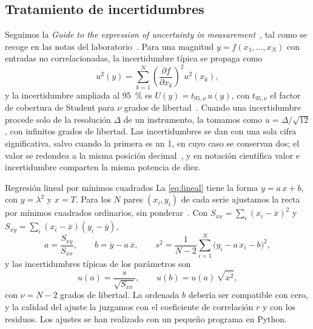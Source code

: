 \documentclass[a4paper,11pt]{amsart}
\numberwithin{equation}{section}
\newcommand{\Tcoef}{t_{95,\nu}}               %
\newcommand{\ext}[1]{U(#1)}                   %
\newcommand{\mean}[1]{\overline{#1}}
\theoremstyle{cienplano}
\theoremstyle{ciendef}
\theoremstyle{cienobs}
\newcounter{metodo}
\newenvironment{metodo}[1][]
  {\par\stepcounter{proposicion}\refstepcounter{metodo}\begin{metodobox}{#1}}
  {\end{metodobox}}
\begin{document}
\subsection{Tratamiento de incertidumbres}\label{sec:incertidumbres}
Seguimos la \emph{Guide to the expression of uncertainty in
measurement}~\cite{GUM}, tal como se recoge en las notas del
laboratorio~\cite{NUM-ARG}. Para una magnitud $y=f(x_1,\dots,x_N)$ con
entradas no correlacionadas, la incertidumbre típica se propaga como
\begin{equation}\label{eq:propagacion}
  u^{2}(y)=\sum_{k=1}^{N}\left(\frac{\partial f}{\partial x_k}\right)^{\!2}u^{2}(x_k),
\end{equation}
y la incertidumbre ampliada al \SI{95}{\percent} es $\ext{y}=\Tcoef\,u(y)$,
con $\Tcoef$ el factor de cobertura de Student para $\nu$ grados de
libertad~\cite{NUM-ARG}. Cuando una incertidumbre procede solo de la
resolución $\Delta$ de un instrumento, la tomamos como
$u=\Delta/\sqrt{12}$, con infinitos grados de libertad. Las incertidumbres se
dan con una sola cifra significativa, salvo cuando la primera es un 1, en
cuyo caso se conservan dos; el valor se redondea a la misma posición
decimal~\cite{ERR-MP}, y en notación científica valor e incertidumbre
comparten la misma potencia de diez.

\begin{metodo}[Regresión lineal por mínimos cuadrados]\label{met:regresion}
La \cref{eq:lineal} tiene la forma $y=a\,x+b$, con $y=\lambda^{2}$ y $x=T$.
Para los $N$ pares $(x_i,y_i)$ de cada serie ajustamos la recta por mínimos
cuadrados ordinarios, sin ponderar~\cite{NUM-ARG,HUGHES}. Con
$S_{xx}=\sum_i(x_i-\mean{x})^{2}$ y $S_{xy}=\sum_i(x_i-\mean{x})(y_i-\mean{y})$,
\begin{equation}\label{eq:regresion}
  a=\frac{S_{xy}}{S_{xx}},
  \qquad
  b=\mean{y}-a\,\mean{x},
  \qquad
  s^{2}=\frac{1}{N-2}\sum_{i=1}^{N}\bigl(y_i-a\,x_i-b\bigr)^{2},
\end{equation}
y las incertidumbres típicas de los parámetros son
\begin{equation}\label{eq:uregresion}
  u(a)=\frac{s}{\sqrt{S_{xx}}},
  \qquad
  u(b)=u(a)\,\sqrt{\mean{x^{2}}},
\end{equation}
con $\nu=N-2$ grados de libertad. La ordenada $b$ debería ser compatible con
cero, y la calidad del ajuste la juzgamos con el coeficiente de correlación
$r$ y con los residuos. Los ajustes se han realizado con un pequeño programa
en Python.
\end{metodo}
\end{document}
